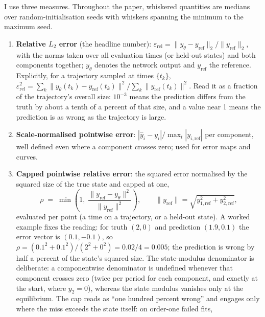\documentclass[11pt,a4paper]{article}
\begin{document}
I use three measures. Throughout the paper, whiskered quantities are
medians over random-initialisation seeds with whiskers spanning the
minimum to the maximum seed.
\begin{enumerate}
  \item \textbf{Relative $L_2$ error} (the headline number):
  $\varepsilon_{\mathrm{rel}} =
  \lVert y_\theta - y_{\mathrm{ref}} \rVert_2 /
  \lVert y_{\mathrm{ref}} \rVert_2$,
  with the norms taken over all evaluation times (or held-out states) and
  both components together; $y_\theta$ denotes the network output and
  $y_{\mathrm{ref}}$ the reference. Explicitly, for a trajectory sampled
  at times $\{t_k\}$,
  $\varepsilon_{\mathrm{rel}}^2 =
  \sum_k \lVert y_\theta(t_k) - y_{\mathrm{ref}}(t_k)\rVert^2 \big/
  \sum_k \lVert y_{\mathrm{ref}}(t_k)\rVert^2$.
  Read it as a fraction of the trajectory's overall size: $10^{-3}$ means
  the prediction differs from the truth by about a tenth of a percent of
  that size, and a value near 1 means the prediction is as wrong as the
  trajectory is large.
  \item \textbf{Scale-normalised pointwise error}:
  $|\hat y_i - y_i| / \max_t |y_{i,\mathrm{ref}}|$ per component, well
  defined even where a component crosses zero; used for error maps and
  curves.
  \item \textbf{Capped pointwise relative error}: the squared error
  normalised by the squared size of the true state and capped at one,
  \begin{equation}
    \rho \;=\; \min\!\left(1,\;
      \frac{\lVert y_{\mathrm{ref}} - y_\theta \rVert^2}
           {\lVert y_{\mathrm{ref}} \rVert^2}\right),
    \qquad
    \lVert y_{\mathrm{ref}} \rVert = \sqrt{y_{1,\mathrm{ref}}^2 + y_{2,\mathrm{ref}}^2},
    \label{eq:rho}
  \end{equation}
  evaluated per point (a time on a trajectory, or a held-out state). A
  worked example fixes the reading: for truth $(2, 0)$ and prediction
  $(1.9, 0.1)$ the error vector is $(0.1, -0.1)$, so
  $\rho = (0.1^2 + 0.1^2)/(2^2 + 0^2) = 0.02/4 = 0.005$; the prediction
  is wrong by half a percent of the state's squared size. The
  state-modulus denominator is deliberate: a
  componentwise denominator is undefined whenever that component crosses
  zero (twice per period for each component, and exactly at the start,
  where $y_2 = 0$), whereas the state modulus vanishes only at the
  equilibrium. The cap reads as ``one hundred percent wrong'' and engages
  only where the miss exceeds the state itself: on order-one failed fits,

\end{enumerate}
\end{document}
